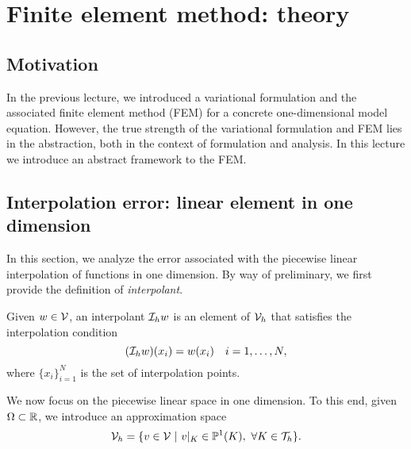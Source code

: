 \chapter{Finite element method: theory}

\disclaimer

\section{Motivation}
In the previous lecture, we introduced a variational formulation and the associated finite element method (FEM) for a concrete one-dimensional model equation.  However, the true strength of the variational formulation and FEM lies in the abstraction, both in the context of formulation and analysis.  In this lecture we introduce an abstract framework to the FEM.





\section{Interpolation error: linear element in one dimension}
\label{sec:fe_interp_1d}
In this section, we analyze the error associated with the piecewise linear interpolation of functions in one dimension. By way of preliminary, we first provide the definition of \emph{interpolant}.
\begin{definition}[interpolant]
Given $w \in \mathcal{V}$, an interpolant $\mathcal{I}_h w$ is an element of $\mathcal{V}_h$ that satisfies the interpolation condition
\begin{equation*}
  (\mathcal{I}_h w)(x_i) = w(x_i) \quad i = 1,\dots, N,
\end{equation*}
where $\{x_i \}_{i=1}^N$ is the set of interpolation points.
\end{definition}

We now focus on the piecewise linear space in one dimension.  To this end, given $\Omega \subset \mathbb{R}$, we introduce an approximation space
\begin{equation*}
  \mathcal{V}_h = \{ v \in \mathcal{V} \ | \ v|_K \in \mathbb{P}^1(K), \ \forall K \in \mathcal{T}_h \}.
\end{equation*}

